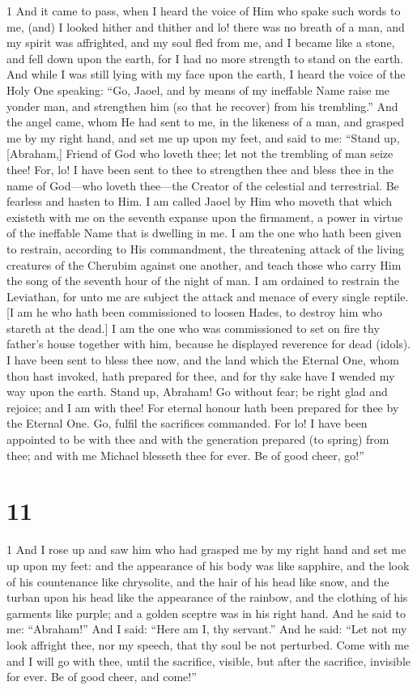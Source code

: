 \par 1 And it came to pass, when I heard the voice of Him who spake such words to me, (and) I looked hither and thither and lo! there was no breath of a man, and my spirit was affrighted, and my soul fled from me, and I became like a stone, and fell down upon the earth, for I had no more strength to stand on the earth. And while I was still lying with my face upon the earth, I heard the voice of the Holy One speaking: “Go, Jaoel, and by means of my ineffable Name raise me yonder man, and strengthen him (so that he recover) from his trembling.” And the angel came, whom He had sent to me, in the likeness of a man, and grasped me by my right hand, and set me up upon my feet, and said to me: “Stand up, [Abraham,] Friend of God who loveth thee; let not the trembling of man seize thee! For, lo! I have been sent to thee to strengthen thee and bless thee in the name of God—who loveth thee—the Creator of the celestial and terrestrial. Be fearless and hasten to Him. I am called Jaoel by Him who moveth that which existeth with me on the seventh expanse upon the firmament, a power in virtue of the ineffable Name that is dwelling in me. I am the one who hath been given to restrain, according to His commandment, the threatening attack of the living creatures of the Cherubim against one another, and teach those who carry Him the song of the seventh hour of the night of man. I am ordained to restrain the Leviathan, for unto me are subject the attack and menace of every single reptile. [I am he who hath been commissioned to loosen Hades, to destroy him who stareth at the dead.] I am the one who was commissioned to set on fire thy father's house together with him, because he displayed reverence for dead (idols). I have been sent to bless thee now, and the land which the Eternal One, whom thou hast invoked, hath prepared for thee, and for thy sake have I wended my way upon the earth. Stand up, Abraham! Go without fear; be right glad and rejoice; and I am with thee! For eternal honour hath been prepared for thee by the Eternal One. Go, fulfil the sacrifices commanded. For lo! I have been appointed to be with thee and with the generation prepared (to spring) from thee; and with me Michael blesseth thee for ever. Be of good cheer, go!”

\chapter{11}

\par 1 And I rose up and saw him who had grasped me by my right hand and set me up upon my feet: and the appearance of his body was like sapphire, and the look of his countenance like chrysolite, and the hair of his head like snow, and the turban upon his head like the appearance of the rainbow, and the clothing of his garments like purple; and a golden sceptre was in his right hand. And he said to me: “Abraham!” And I said: “Here am I, thy servant.” And he said: “Let not my look affright thee, nor my speech, that thy soul be not perturbed. Come with me and I will go with thee, until the sacrifice, visible, but after the sacrifice, invisible for ever. Be of good cheer, and come!”

